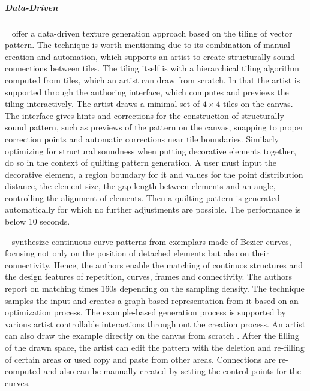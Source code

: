 \subparagraph*{Data-Driven}
\label{subpara:analysis_regular_tilings}

\citeauthor*{bian_2018_tpd}~\cite{bian_2018_tpd} offer a data-driven texture generation approach based on the tiling of vector pattern. The technique is worth mentioning due to its combination of manual creation and automation, which supports an artist to create structurally sound connections between tiles. The tiling itself is with a hierarchical tiling algorithm computed from tiles, which an artist can draw from scratch. In that the artist is supported through the authoring interface, which computes and previews the tiling interactively. The artist draws a minimal set of $4\times4$ tiles on the canvas. The interface gives hints and corrections for the construction of structurally sound pattern, such as previews of the pattern on the canvas, snapping to proper correction points and automatic corrections near tile boundaries. Similarly optimizing for structural soundness when putting decorative elements together,~\citeauthor*{li_2019_aqp}~\cite{li_2019_aqp} do so in the context of quilting pattern generation. A user must input the decorative element, a region boundary for it and values for the point distribution distance, the element size, the gap length between elements and an angle, controlling the alignment of elements. Then a quilting pattern is generated automatically for which no further adjustments are possible. The performance is below 10 seconds.

\citeauthor*{tu_2020_cct}~\cite{tu_2020_cct} synthesize continuous curve patterns from exemplars made of Bezier-curves, focusing not only on the position of detached elements but also on their connectivity. Hence, the authors enable the matching of continuos structures and the design features of repetition, curves, frames and connectivity. The authors report on matching times 160s depending on the sampling density. The technique samples the input and creates a graph-based representation from it based on an optimization process. The example-based generation process is supported by various artist controllable interactions through out the creation process. An artist can also draw the example directly on the canvas from scratch . After the filling of the drawn space, the artist can edit the pattern with the deletion and re-filling of certain areas or used copy and paste from other areas. Connections are re-computed and also can be manually created by setting the control points for the curves.

